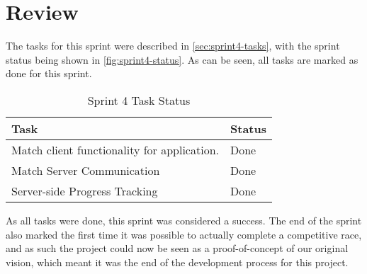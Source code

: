 \section{Review}
\label{sec:sprint4-review}

The tasks for this sprint were described in \autoref{sec:sprint4-tasks}, with the sprint status being shown in \autoref{fig:sprint4-status}. As can be seen, all tasks are marked as done for this sprint.

\begin{table}[!ht]
	\centering
	\begin{tabular}{|l|l|}
		\hline
		\textbf{Task} & \textbf{Status} \\
		\hline
		Match client functionality for application. & Done \\
		\hline
		Match Server Communication & Done \\
		\hline
		Server-side Progress Tracking & Done \\
		\hline
	\end{tabular}
	\caption{Sprint 4 Task Status}
	\label{fig:sprint4-status}
\end{table}

As all tasks were done, this sprint was considered a success. The end of the sprint also marked the first time it was possible to actually complete a competitive race, and as such the project could now be seen as a proof-of-concept of our original vision, which meant it was the end of the development process for this project.
